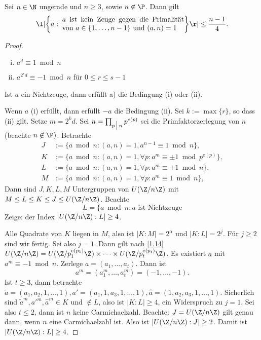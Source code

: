 \begin{prop} \label{3.21}
	Sei $n \in \N$ ungerade und $n \ge 3$, sowie $n \not\in \P$.
	Dann gilt
	\[
		\l| \bigg\{ a : \; \parbox{0.5\textwidth}{ $a$ ist kein Zeuge gegen die Primalität von $a \in \{1, \dotsc, n-1\}$ und $(a,n) = 1$} \bigg\} \r| \le \dfrac{n-1}4.
	\]
	\begin{proof}
		\begin{enumerate}[(i)]
			\item
				$a^d \equiv 1 \bmod n$
			\item
				$a^{2^r d} \equiv -1 \bmod n$ für $0 \le r \le s-1$
		\end{enumerate}
		Ist $a$ ein Nichtzeuge, dann erfüllt a) die Bedingung (i) oder (ii).

		Wenn $a$ (i) erfüllt, dann erfüllt $-a$ die Bedingung (ii).
		Sei $k := \max\{r\}$, so dass (ii) gilt.
		Setze $m = 2^k d$.
		Sei $n = \prod_{p\divs n} p^{e(p)}$ sei die Primfaktorzerlegung von $n$ (beachte $n \not\in \P)$.
		Betrachte
		\begin{align*}
			J &:= \{ a \bmod n : (a,n) = 1, a^{n-1} \equiv 1 \bmod n \}, \\
			K &:= \{ a \bmod n : (a,n) = 1, \forall p : a^{m} \equiv \pm 1 \bmod p^{e(p)} \}, \\
			L &:= \{ a \bmod n : (a,n) = 1, \forall p : a^{m} \equiv \pm 1 \bmod n \}, \\
			M &:= \{ a \bmod n : (a,n) = 1, \forall p : a^{m} \equiv 1 \bmod n \},
		\end{align*}
		Dann sind $J, K, L, M$ Untergruppen von $U(\Z / n \Z)$ mit $M \le L \le K \le J \le U(\Z / n\Z)$.
		Beachte
		\[
			L = \{ a \bmod n : \text{$a$ ist Nichtzeuge}
		\]
		Zeige: der Index $|U(\Z / n\Z) : L | \ge 4$.

		Alle Quadrate von $K$ liegen in $M$, also ist $|K : M| = 2^\alpha$ und $|K : L| = 2^j$.
		Für $j \ge 2$ sind wir fertig.
		Sei also $j = 1$.
		Dann gilt nach \ref{1.14} $U(\Z/n\Z) = U(\Z/p_1^{e(p_1)}\Z) \times \dotsb \times U(\Z/p_t^{e(p_t)}\Z)$.
		Es existiert $a$ mit $a^m \equiv -1 \bmod n$.
		Zerlege $a = (a_1, \dotsc, a_t)$.
		Dann ist
		\[
			a^m = (a_1^m, \dotsc, a_t^m) = (-1, \dotsc, -1).
		\]
		Ist $t \ge 3$, dann betrachte $\tilde a = (a_1, a_2, 1, \dotsc, 1), a' = (a_1, 1, a_3, 1, \dotsc, 1), \hat a = (1, a_2, a_3, 1, \dotsc, 1)$.
		Sicherlich sind $\tilde a^m, a'^m, \hat a^m \in K$ und $\not\in L$, also ist $|K : L| \ge 4$, ein Widerspruch zu $j = 1$.
		Sei also $t \le 2$, dann ist $n$ keine Carmichaelzahl.
		Beachte: $J = U(\Z / n\Z)$ gilt genau dann, wenn $n$ eine Carmichaelzahl ist.
		Also ist $| U(\Z / n\Z) : J| \ge 2$.
		Damit ist $| U(\Z / n\Z) : L| \ge 4$.


\end{proof}
\end{prop}
